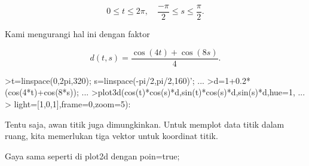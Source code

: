 \documentclass[12pt,arial,letterpaper]{book}
\begin{document}
\begin{eulernootebook}
\begin{eulercomment}
\begin{eulercomment}
\begin{eulernootebook}
\begin{eulercomment}
\begin{eulercomment}
\begin{eulercomment}
\begin{eulercomment}
\begin{eulercomment}
\begin{eulercomment}
\begin{eulercomment}
\begin{eulernotebook}
\begin{eulercomment}
\end{eulercomment}
\begin{eulerformula}
\[
0 \le t \le 2\pi, \quad \frac{-\pi}{2} \le s \le \frac{\pi}{2}.
\]
\end{eulerformula}
\begin{eulercomment}
Kami mengurangi hal ini dengan faktor

\end{eulercomment}
\begin{eulerformula}
\[
d(t,s) = \frac{\cos(4t)+\cos(8s)}{4}.
\]
\end{eulerformula}
\begin{eulerprompt}
>t=linspace(0,2pi,320); s=linspace(-pi/2,pi/2,160)'; ...
>d=1+0.2*(cos(4*t)+cos(8*s)); ...
>plot3d(cos(t)*cos(s)*d,sin(t)*cos(s)*d,sin(s)*d,hue=1, ...
>  light=[1,0,1],frame=0,zoom=5):
\end{eulerprompt}
\begin{eulercomment}
Tentu saja, awan titik juga dimungkinkan. Untuk memplot data titik
dalam ruang, kita memerlukan tiga vektor untuk koordinat titik.

Gaya sama seperti di plot2d dengan poin=true;


\end{eulercomment}
\end{eulernotebook}
\end{eulercomment}
\end{eulercomment}
\end{eulercomment}
\end{eulercomment}
\end{eulercomment}
\end{eulercomment}
\end{eulercomment}
\end{eulernootebook}
\end{eulercomment}
\end{eulercomment}
\end{eulernootebook}
\end{document}
